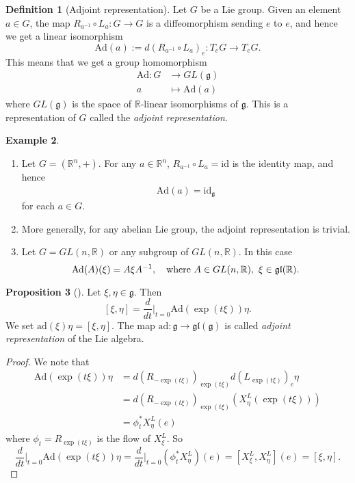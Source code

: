 \documentclass{amsart}
\numberwithin{equation}{section}
\newcommand{\bR}{\mathbb{R}}
\newcommand{\Ad}{\mathrm{Ad}}
\newcommand{\ad}{\mathrm{ad}}
\newcommand{\fg}{\mathfrak{g}}
\newcommand{\fgl}{\mathfrak{gl}}
\theoremstyle{definition}
\newtheorem{definition}{Definition} [section]
\newtheorem{example}[definition]{Example}
\theoremstyle{theorem}
\newtheorem{proposition}[definition]{Proposition}
\begin{document}
\begin{definition}[Adjoint representation]
Let $G$ be a Lie group. Given an element $a\in G$, the map $R_{a^{-1}} \circ L_a : G \to G$ 
is a diffeomorphism sending $e$ to $e$, and hence we get a linear isomorphism 
\[
\Ad(a) := d(R_{a^{-1}} \circ L_a)_e : T_eG \to T_eG.
\]
This means that we get a group homomorphism
\begin{align*}
\Ad : G &\to GL(\fg) \\
a &\mapsto \Ad(a)
\end{align*}
where $GL(\fg)$ is the space of $\bR$-linear isomorphisms of $\fg$. This is a representation of $G$ called the 
{\em adjoint representation}. 
\end{definition}

\begin{example}
\begin{enumerate}
\item Let $G = (\bR^n, +)$. For any $a\in \bR^n$, $R_{a^{-1}} \circ L_a = \mathrm{id}$ is the identity map, and hence 
\begin{align*}
\Ad(a) = \text{id}_{\fg}
\end{align*}
for each $a \in G$. 
\item More generally, for any abelian Lie group, the adjoint representation is trivial.
 
\item Let $G = GL(n,\bR)$ or any subgroup of $GL(n,\bR)$. In this case 
\[
\Ad(A)(\xi) = A \xi A^{-1},\quad \textup{where }A\in GL(n,\bR),\ \xi\in \fgl(\bR).
\]
\end{enumerate}
\end{example}

\begin{proposition}[{\cite[page 41]{dC}}]
Let $\xi, \eta \in \fg$. Then 
\[
[\xi, \eta] = \frac{d}{dt}\Big|_{t=0}\Ad(\exp(t \xi))\eta.
\]
We set $\ad(\xi)\eta = [\xi, \eta]$. The map $\ad : \fg \to \fgl(\fg)$ is called {\em adjoint representation} of the Lie algebra. 
\end{proposition}

\begin{proof}
We note that 
\begin{align*}
\Ad(\exp(t\xi))\eta &= d(R_{-\exp(t\xi)})_{\exp(t\xi)}d(L_{\exp(t\xi)})_e\eta \\
&= d(R_{-\exp(t\xi)})_{\exp(t\xi)}(X_\eta^L(\exp(t\xi))) \\
&= \phi_t^*X_\eta^L(e)
\end{align*}
where $\phi_t = R_{\exp(t\xi)}$ is the flow of $X^L_\xi$. So 
\[
\frac{d}{dt}\Big|_{t=0} \Ad(\exp(t\xi))\eta = \frac{d}{dt}\Big|_{t=0} (\phi_t^*X_\eta^L)(e)
= [X_\xi^L, X_\eta^L](e) = [\xi, \eta].
\]
\end{proof}
\end{document}
